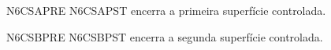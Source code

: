 \documentclass{abntexto-ufc}
\begin{document}
\textual

\noindent N6CSAPRE \cite{silva2020} N6CSAPST encerra a primeira superfície controlada.

\noindent N6CSBPRE \textcite{oliveira2011} N6CSBPST encerra a segunda superfície controlada.
\end{document}
